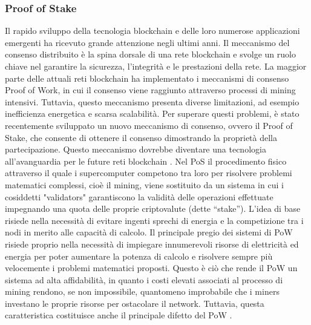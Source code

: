 \subsubsection{Proof of Stake}
Il rapido sviluppo della tecnologia blockchain e delle loro numerose applicazioni emergenti ha ricevuto grande attenzione negli ultimi anni. Il meccanismo del consenso distribuito è la spina dorsale di una rete blockchain e svolge un ruolo chiave nel garantire la sicurezza, l'integrità e le prestazioni della rete. La maggior parte delle attuali reti blockchain ha implementato i meccanismi di consenso Proof of Work, in cui il consenso viene raggiunto attraverso processi di mining intensivi. Tuttavia, questo meccanismo presenta diverse limitazioni, ad esempio inefficienza energetica e scarsa scalabilità. Per superare questi problemi, è stato recentemente sviluppato un nuovo meccanismo di consenso, ovvero il Proof of Stake, che consente di ottenere il consenso dimostrando la proprietà della partecipazione. Questo meccanismo dovrebbe diventare una tecnologia all'avanguardia per le future reti blockchain \cite{nguyen2019proof}. Nel PoS il procedimento fisico attraverso il quale i supercomputer competono tra loro per risolvere problemi matematici complessi, cioè il mining, viene sostituito da un sistema in cui i cosiddetti "validators" garantiscono la validità delle operazioni effettuate impegnando una quota delle proprie criptovalute (dette “stake”). L’idea di base risiede nella necessità di evitare ingenti sprechi di energia e la competizione tra i nodi in merito alle capacità di calcolo. Il principale pregio dei sistemi di PoW risiede proprio nella necessità di impiegare innumerevoli risorse di elettricità ed energia per poter aumentare la potenza di calcolo e risolvere sempre più velocemente i problemi matematici proposti. Questo è ciò che rende il PoW un sistema ad alta affidabilità, in quanto i costi elevati associati al processo di mining rendono, se non impossibile, quantomeno improbabile che i miners investano le proprie risorse per ostacolare il network. Tuttavia, questa caratteristica costituisce anche il principale difetto del PoW \cite{pos}.

